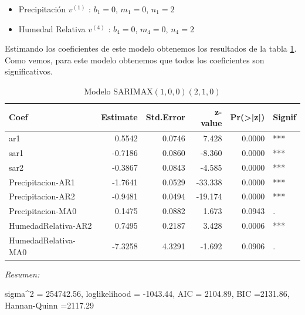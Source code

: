 \documentclass[12pt,oneside]{book}\usepackage[]{graphicx}\usepackage[]{color}
\newenvironment{knitrout}{}{} %
\theoremstyle{definition} %
\begin{document}
\begin{itemize}
\item Precipitación $v^{(1)}$ : $b_1= 0$, $m_1=0$, $n_1=2$
\item Humedad Relativa $v^{(4)}$ : $b_4= 0$, $m_4=0$, $n_4=2$
\end{itemize}


Estimando los coeficientes de este modelo obtenemos los resultados de la tabla \ref{tab:sarimax_estim3}. Como vemos, para este modelo obtenemos que todos los coeficientes son significativos. 


\begin{knitrout}
\color{fgcolor}\begin{table}

\caption{\label{tab:unnamed-chunk-55}\label{tab:sarimax_estim3}Modelo SARIMAX$(1,0,0)(2,1,0)$}
\centering
\begin{threeparttable}
\begin{tabular}[t]{lrrrrl}
\toprule
Coef & Estimate & Std.Error & z-value & Pr(>|z|) & Signif\\
\midrule
\rowcolor{gray!6}  ar1 & 0.5542 & 0.0746 & 7.428 & 0.0000 & ***\\
sar1 & -0.7186 & 0.0860 & -8.360 & 0.0000 & ***\\
\rowcolor{gray!6}  sar2 & -0.3867 & 0.0843 & -4.585 & 0.0000 & ***\\
Precipitacion-AR1 & -1.7641 & 0.0529 & -33.338 & 0.0000 & ***\\
\rowcolor{gray!6}  Precipitacion-AR2 & -0.9481 & 0.0494 & -19.174 & 0.0000 & ***\\
\addlinespace
Precipitacion-MA0 & 0.1475 & 0.0882 & 1.673 & 0.0943 & .\\
\rowcolor{gray!6}  HumedadRelativa-AR2 & 0.7495 & 0.2187 & 3.428 & 0.0006 & ***\\
HumedadRelativa-MA0 & -7.3258 & 4.3291 & -1.692 & 0.0906 & .\\
\bottomrule
\end{tabular}
\begin{tablenotes}
\item \textit{Resumen:} 
\item sigma\textasciicircum{}2 = 254742.56, loglikelihood = -1043.44, AIC = 2104.89, BIC =2131.86, Hannan-Quinn =2117.29
\end{tablenotes}
\end{threeparttable}
\end{table}


\end{knitrout}
\end{document}
